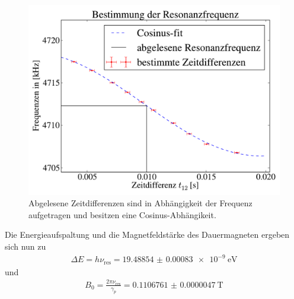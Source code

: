 \documentclass[paper=a4,
	fontsize=10pt,
	DIV=18,
	twocolumn,
	parskip=half
	]{scrartcl}
\numberwithin{equation}{section}    %
\newcommand{\tra}{$\rightarrow$}
\newcommand{\Tra}{$\Rightarrow$}
\begin{document}
\begin{figure}[htp]
	\begin{center}
		\includegraphics[width=\columnwidth]{Data-Plots/02-Resonanzfrequenz.pdf}
		\caption{Abgelesene Zeitdifferenzen sind in Abhängigkeit der Frequenz aufgetragen und besitzen eine Cosinus-Abhängikeit.}
		\label{resonanzfrequenz}
	\end{center}
\end{figure}
Die Energieaufspaltung und die Magnetfeldstärke des Dauermagneten ergeben sich nun zu
\begin{align}
	\Delta E =h\nu_{\mathrm{res}}=\SI[separate-uncertainty=false]{19.48854(83) e-9}{\eV}
\end{align}
und
\begin{align}
	B_0=\frac{2 \pi \nu_{\mathrm{res}}}{\gamma_p}=\SI[separate-uncertainty=false]{0.1106761(47)}{\tesla}
\end{align}
\end{document}
